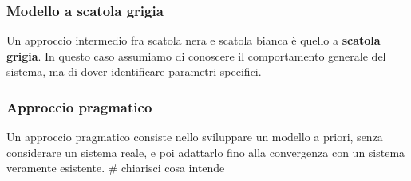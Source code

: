 \documentclass[a4paper,11pt]{article}
\begin{document}
\begin{center}
\end{center}

\subsubsection{Modello a scatola grigia}
Un approccio intermedio fra scatola nera e scatola bianca è quello a \textbf{scatola grigia}.
In questo caso assumiamo di conoscere il comportamento generale del sistema, ma di dover identificare parametri specifici.

\subsubsection{Approccio pragmatico}
Un approccio pragmatico consiste nello sviluppare un modello a priori, senza considerare un sistema reale, e poi adattarlo fino alla convergenza con un sistema veramente esistente. # chiarisci cosa intende
\end{document}
